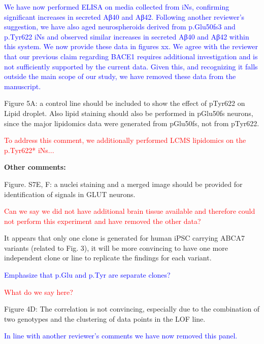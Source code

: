 \textcolor{blue}{We have now performed ELISA on media collected from iNs, confirming significant increases in secreted Aβ40 and Aβ42. Following another reviewer's suggestion, we have also aged neurospheroids derived from p.Glu50fs3 and p.Tyr622 iNs and observed similar increases in secreted Aβ40 and Aβ42 within this system. We now provide these data in figures xx. We agree with the reviewer that our previous claim regarding BACE1 requires additional investigation and is not sufficiently supported by the current data. Given this, and recognizing it falls outside the main scope of our study, we have removed these data from the manuscript.}

Figure 5A: a control line should be included to show the effect of pTyr622 on Lipid droplet. Also lipid staining should also be performed in pGlu50fs neurons, since the major lipidomics data were generated from pGlu50fs, not from pTyr622.

\textcolor{red}{To address this comment, we additionally performed LCMS lipidomics on the p.Tyr622* iNs...}

\textbf{Other comments:}

Figure. S7E, F: a nuclei staining and a merged image should be provided for identification of signals in GLUT neurons.

\textcolor{red}{Can we say we did not have additional brain tissue available and therefore could not perform this experiment and have removed the other data?}

It appears that only one clone is generated for human iPSC carrying ABCA7 variants (related to Fig. 3), it will be more convincing to have one more independent clone or line to replicate the findings for each variant.

\textcolor{blue}{Emphasize that p.Glu and p.Tyr are separate clones?}

\textcolor{red}{What do we say here?}

Figure 4D: The correlation is not convincing, especially due to the combination of two genotypes and the clustering of data points in the LOF line.

\textcolor{blue}{In line with another reviewer’s comments we have now removed this panel.}

